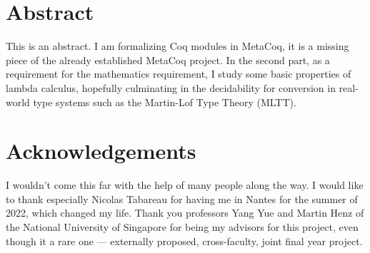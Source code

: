 

\dedication{ Try not to focus on the logical details, instead, try to focus on
the simplicity behind the details.  \flushright--- Leung Man Chun }


\maketitle

\begingroup
  \let\cleardoublepage\clearpage
\chapter*{Abstract}

This is an abstract. I am formalizing Coq modules in MetaCoq, it is a missing
piece of the already established MetaCoq project. In the second part, as a
requirement for the mathematics requirement, I study some basic properties of
lambda calculus, hopefully culminating in the decidability for conversion in
real-world type systems such as the Martin-Lof Type Theory (MLTT).

\chapter*{Acknowledgements}

I wouldn't come this far with the help of many people along the way. I would
like to thank especially Nicolas Tabareau for having me in Nantes for the summer
of 2022, which changed my life. Thank you professors Yang Yue and Martin Henz of
the National University of Singapore for being my advisors for this project,
even though it a rare one --- externally proposed, cross-faculty, joint final
year project.

